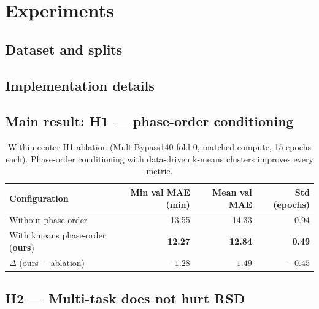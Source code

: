 \section{Experiments}
\label{sec:experiments}

\subsection{Dataset and splits}

\subsection{Implementation details}

\subsection{Main result: H1 --- phase-order conditioning}
\label{sec:h1}
\begin{table}[t]
  \centering
  \caption{Within-center H1 ablation (MultiBypass140 fold 0, matched compute, 15 epochs each).
    Phase-order conditioning with data-driven k-means clusters improves every metric.}
  \label{tab:h1}
  \begin{tabular}{lrrr}
    \toprule
    Configuration & Min val MAE (min) & Mean val MAE & Std (epochs) \\
    \midrule
    Without phase-order & 13.55 & 14.33 & 0.94 \\
    With kmeans phase-order (\textbf{ours}) & \textbf{12.27} & \textbf{12.84} & \textbf{0.49} \\
    $\Delta$ (ours $-$ ablation) & $-1.28$ & $-1.49$ & $-0.45$ \\
    \bottomrule
  \end{tabular}
\end{table}

\subsection{H2 --- Multi-task does not hurt RSD}


